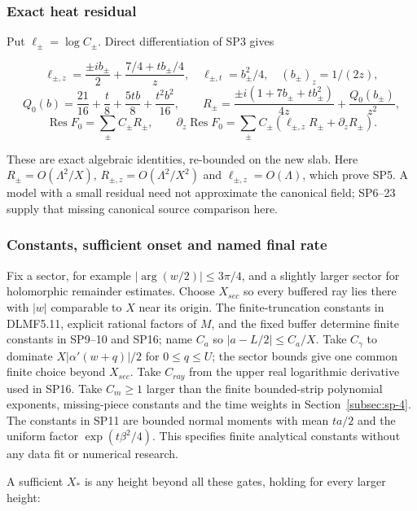 \subsubsection{Exact heat residual}
\label{subsec:sp-6}

Put \(\ell_\pm=\log C_\pm\). Direct differentiation of SP3 gives

\[
\ell_{\pm,z}=\frac{\pm i b_\pm}{2}
 +\frac{7/4+t b_\pm/4}{z},\quad
\ell_{\pm,t}=b_\pm^2/4,\quad (b_\pm)_z=1/(2z),
\]
\[
Q_0(b)=\frac{21}{16}+\frac t8+\frac{5tb}{8}+\frac{t^2b^2}{16},
\qquad
R_\pm=\frac{\pm i(1+7b_\pm+t b_\pm^2)}{4z}
              +\frac{Q_0(b_\pm)}{z^2},
\]
\[
\operatorname{Res}F_0=\sum_\pm C_\pm R_\pm,\qquad
\partial_z\operatorname{Res}F_0
 =\sum_\pm C_\pm(\ell_{\pm,z}R_\pm+\partial_zR_\pm).
\tag{SP24}\label{eq:ansatz-sp24}
\]

These are exact algebraic identities, re-bounded on the new slab. Here \(R_\pm=O(\Lambda^{2}/X)\), \(R_{\pm,z}=O(\Lambda^{2}/X^{2})\) and \(\ell_{\pm,z}=O(\Lambda)\), which prove SP5. A model with a small residual need not approximate the canonical field; SP6--23 supply that missing canonical source comparison here.

\subsubsection{Constants, sufficient onset and named final rate}
\label{subsec:sp-7}

Fix a sector, for example \(|\arg(w/2)|\le 3\pi/4\), and a slightly larger sector for holomorphic remainder estimates. Choose \(X_{sec}\) so every buffered ray lies there with \(|w|\) comparable to \(X\) near its origin. The finite-truncation constants in DLMF5.11, explicit rational factors of \(M\), and the fixed buffer determine finite constants in SP9--10 and SP16; name \(C_{a}\) so \(|a-L/2|\le C_{a}/X\). Take \(C_{\gamma}\) to dominate \(X|\alpha'(w+q)|/2\) for \(0\le q\le U\); the sector bounds give one common finite choice beyond \(X_{sec}\). Take \(C_{ray}\) from the upper real logarithmic derivative used in SP16. Take \(C_{m}\ge 1\) larger than the finite bounded-strip polynomial exponents, missing-piece constants and the time weights in Section~\ref{subsec:sp-4}. The constants in SP11 are bounded normal moments with mean \(ta/2\) and the uniform factor \(\exp(t \beta^{2}/4)\). This specifies finite analytical constants without any data fit or numerical research.

A sufficient \(X_*\) is any height beyond all these gates, holding for every larger height:

